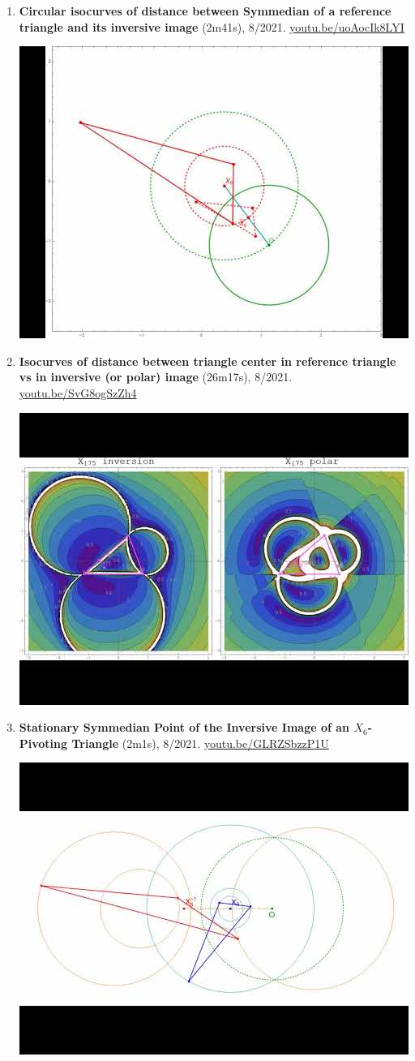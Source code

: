 \documentclass[12pt]{article}
\begin{document}
\begin{enumerate}[resume]
\item \textbf{Circular isocurves of distance between Symmedian of a reference triangle and its inversive image} (2m41s), 8/2021. \href{https://youtu.be/uoAocIk8LYI}{\url{youtu.be/uoAocIk8LYI}}
\begin{center}\includegraphics[width=.5\textwidth]{pics/uoAocIk8LYI.jpg}\end{center}
% 
\item \textbf{Isocurves of distance between triangle center in reference triangle vs in inversive (or polar) image} (26m17s), 8/2021. \href{https://youtu.be/SvG8ogSzZh4}{\url{youtu.be/SvG8ogSzZh4}}
\begin{center}\includegraphics[width=.5\textwidth]{pics/SvG8ogSzZh4.jpg}\end{center}
% 
\item \textbf{Stationary Symmedian Point of the Inversive Image of an $X_{6}$-Pivoting Triangle} (2m1s), 8/2021. \href{https://youtu.be/GLRZSbzzP1U}{\url{youtu.be/GLRZSbzzP1U}}
\begin{center}\includegraphics[width=.5\textwidth]{pics/GLRZSbzzP1U.jpg}\end{center}

\end{enumerate}
\end{document}
